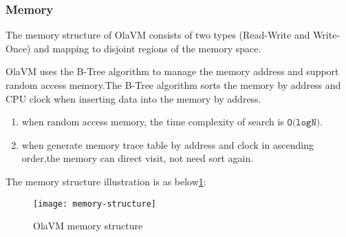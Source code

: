 \subsubsection{Memory}\label{subsec: ola-memory}
The memory structure of OlaVM consists of two types (Read-Write and Write-Once) and mapping to disjoint regions of the memory space.
\begin{table}[!ht]
    \caption{Memory segment range}
    \label{table:memory-segment-range}
\end{table}


OlaVM uses the B-Tree algorithm to manage the memory address and support random access memory.The B-Tree algorithm sorts the memory by address and CPU clock when inserting data into the memory by address.
\begin{enumerate}
    \item when random access memory, the time complexity of search is $\texttt{O(logN)}$.
    \item when generate memory trace table by address and clock in ascending order,the memory can direct visit, not need sort again.
\end{enumerate}

The memory structure illustration is as below\ref{fig: B-tree-memory}:
\begin{figure}[!htp]
    \centering
    \texttt{[image: memory-structure]}
    \caption{OlaVM memory structure}
    \label{fig: B-tree-memory}
\end{figure}
